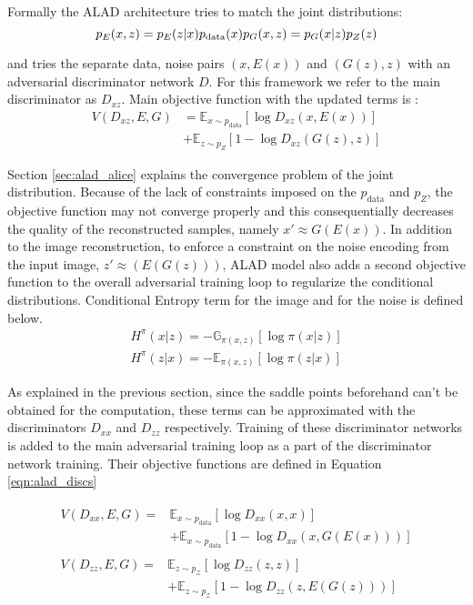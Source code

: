 Formally the ALAD architecture tries to match the joint distributions: 
\begin{equation}
    p_{E} (x, z) = p_{E}(z | x) p_{\text{data}}(x) \\[5pt]
    p_{G} (x, z) = p_{G}(x | z) p_{Z}(z)
\end{equation}

and tries the separate data, noise pairs $(x, E(x))$ and $(G(z), z)$ with an adversarial
discriminator network $D$. For this framework we refer to the main discriminator as $D_{xz}$. Main
objective function with the updated terms is :
\begin{equation}
\begin{aligned} V\left(D_{x z}, E, G\right) &=\mathbb{E}_{x \sim p_{\text{data}}}\left[\log D_{x z}(x, E(x))\right] \\ &+\mathbb{E}_{z \sim p_{Z}}\left[1-\log D_{x z}(G(z), z)\right]
 \end{aligned}
\end{equation}

Section \ref{sec:alad_alice} explains the convergence problem of the joint distribution. Because of
the lack of constraints imposed on the $p_{\text{data}}$ and $p_{Z}$, the objective function may not
converge properly and this consequentially decreases the quality of the reconstructed samples,
namely $x' \approx G(E(x))$. In addition to the image reconstruction, to enforce a constraint on the
noise encoding from the input image, $z' \approx (E(G(z)))$, ALAD model also adds a second
objective function to the overall adversarial training loop to regularize the conditional
distributions. Conditional Entropy term for the image and for the noise is defined below.
\begin{align}
    H^{\pi}(x | z)=-\mathbb{G}_{\pi(x, z)}[\log \pi(x | z)] \\[5pt]
    H^{\pi}(z | x)=-\mathbb{E}_{\pi(x, z)}[\log \pi(z | x)] 
\end{align}

As explained in the previous section, since the saddle points beforehand can't be obtained for the
computation, these terms can be approximated with the discriminators $D_{xx}$ and $D_{zz}$
respectively. Training of these discriminator networks is added to the main adversarial training loop as
a part of the discriminator network training. Their objective functions are defined in Equation
\ref{eqn:alad_discs}

\begin{align}
    \label{eqn:alad_discs}
\begin{split} V\left(D_{x x}, E, G\right) ={}&\mathbb{E}_{x \sim p_{\text{data}}}\left[\log D_{x x}(x, x)\right] \\ &+\mathbb{E}_{x \sim p_{\text{data}}}\left[1-\log D_{x x}(x, G(E(x)))\right] \end{split}  \\[5pt]
\begin{split} V\left(D_{z z}, E, G\right) ={}&\mathbb{E}_{z \sim p_{\mathcal{Z}}}\left[\log D_{z z}(z, z)\right] \\ &+\mathbb{E}_{z \sim p_{\mathcal{Z}}}\left[1-\log D_{z z}(z, E(G(z)))\right] \end{split}    
\end{align}

